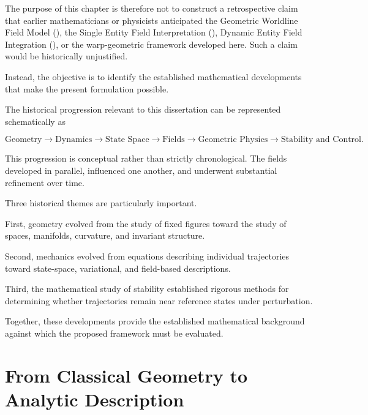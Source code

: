 \documentclass[12pt,oneside]{book}
\newcommand{\GWFM}{\mathrm{GWFM}}
\newcommand{\SEFI}{\mathrm{SEFI}}
\newcommand{\DEFI}{\mathrm{DEFI}}
\begin{document}
The purpose of this chapter is therefore not to construct a
retrospective claim that earlier mathematicians or physicists
anticipated the Geometric Worldline Field Model (\GWFM), the
Single Entity Field Interpretation (\SEFI), Dynamic Entity Field
Integration (\DEFI), or the warp-geometric framework developed
here. Such a claim would be historically unjustified.

Instead, the objective is to identify the established
mathematical developments that make the present formulation
possible.

The historical progression relevant to this dissertation can be
represented schematically as

\begin{equation}
    \text{Geometry}
    \longrightarrow
    \text{Dynamics}
    \longrightarrow
    \text{State Space}
    \longrightarrow
    \text{Fields}
    \longrightarrow
    \text{Geometric Physics}
    \longrightarrow
    \text{Stability and Control}.
    \label{eq:historical-progression}
\end{equation}

This progression is conceptual rather than strictly
chronological. The fields developed in parallel, influenced one
another, and underwent substantial refinement over time.

Three historical themes are particularly important.

First, geometry evolved from the study of fixed figures toward
the study of spaces, manifolds, curvature, and invariant
structure.

Second, mechanics evolved from equations describing individual
trajectories toward state-space, variational, and field-based
descriptions.

Third, the mathematical study of stability established rigorous
methods for determining whether trajectories remain near
reference states under perturbation.

Together, these developments provide the established
mathematical background against which the proposed framework
must be evaluated.


\section{From Classical Geometry to Analytic Description}
\label{sec:classical-to-analytic-geometry}
\end{document}
